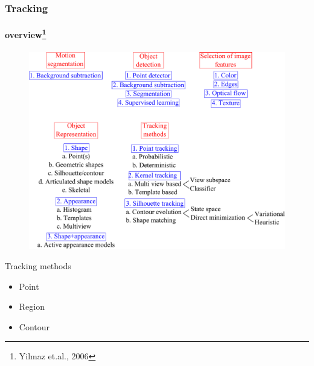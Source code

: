 \begin{frame}[plain]
\frametitle{Tracking}
\framesubtitle{overview\tiny{\footnote {Yilmaz et.al., 2006}}}
\logoCSIPCPL\mypagenum
	\begin{changemargin}{-1.3in}{0in}
		\begin{figure}
			\includegraphics[width=1.3\textwidth]{thesis/TRK_overview.pdf}
		\end{figure}	
	\end{changemargin}
	\begin{block}{Tracking methods}
		\begin{itemize}
			\item Point
			\item Region
			\item Contour
		\end{itemize}
	\end{block}
\end{frame}



